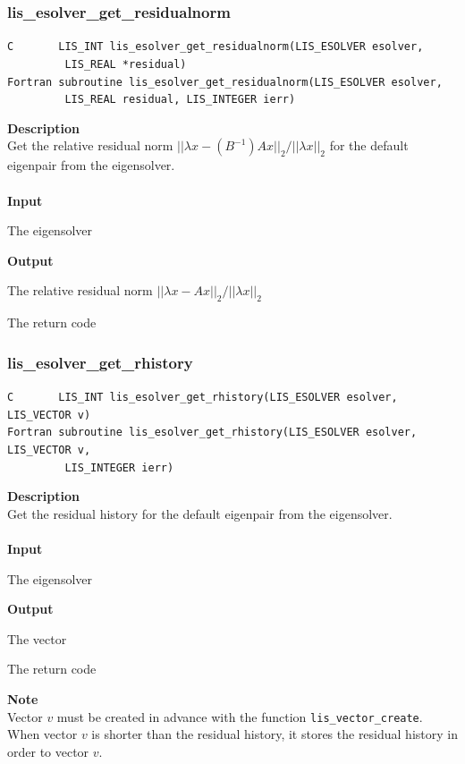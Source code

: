 \documentclass[a4paper]{article}
\newcommand{\namelistlabel}[1]{\mbox{#1}\hfill}
\newenvironment{namelist}[1]{%
\begin{list}{}
  {\let\makelabel\namelistlabel
  \settowidth{\labelwidth}{#1}
  \setlength{\leftmargin}{1.1\labelwidth}}
  }{%
\end{list}}
\begin{document}
\subsubsection{lis\_esolver\_get\_residualnorm}
\begin{screen}
\verb|C       LIS_INT lis_esolver_get_residualnorm(LIS_ESOLVER esolver,|\\
\verb|         LIS_REAL *residual)|\\
\verb|Fortran subroutine lis_esolver_get_residualnorm(LIS_ESOLVER esolver,|\\
\verb|         LIS_REAL residual, LIS_INTEGER ierr)|
\end{screen}
{\bf Description}\\
\indent
Get the relative residual norm $||\lambda x-(B^{-1})Ax||_2/||\lambda x||_2$ for the default eigenpair from the eigensolver.
\\ \\
\noindent
{\bf Input}
\begin{namelist}{XXXXXXXXXXXXXXXXXXXX}
\item[\tt esolver] The eigensolver
\end{namelist}
{\bf Output}
\begin{namelist}{XXXXXXXXXXXXXXXXXXXX}
\item[\tt residual]  The relative residual norm $||\lambda x-Ax||_2/||\lambda x||_2$
\item[\tt ierr] The return code
\end{namelist}

\newpage
\subsubsection{lis\_esolver\_get\_rhistory}
\begin{screen}
\verb|C       LIS_INT lis_esolver_get_rhistory(LIS_ESOLVER esolver, LIS_VECTOR v)|\\
\verb|Fortran subroutine lis_esolver_get_rhistory(LIS_ESOLVER esolver, LIS_VECTOR v,|\\
\verb|         LIS_INTEGER ierr)|
\end{screen}
{\bf Description}\\
\indent
Get the residual history for the default eigenpair from the eigensolver.
\\ \\
\noindent
{\bf Input}
\begin{namelist}{XXXXXXXXXXXXXXXXXXXX}
\item[\tt esolver] The eigensolver
\end{namelist}
{\bf Output}
\begin{namelist}{XXXXXXXXXXXXXXXXXXXX}
\item[\tt v] The vector
\item[\tt ierr] The return code
\end{namelist}
{\bf Note}\\
\indent
Vector $v$ must be created in advance with the function \verb|lis_vector_create|. 
When vector $v$ is shorter than the residual history, 
it stores the residual history in order to vector $v$.
\end{document}
